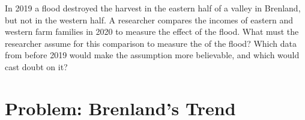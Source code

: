 \begin{exercise}[$\star\star\star$]\label{exo:g10:economic-models:15}
In 2019 a flood destroyed the harvest in the eastern half of a valley in Brenland, but not in the
western half. A researcher compares the incomes of eastern and western farm families in 2020 to
measure the effect of the flood. What must the researcher assume for this comparison to measure the
 of the flood? Which data from before 2019 would make the assumption more believable,
and which would cast doubt on it?
\end{exercise}

\section{Problem: Brenland's Trend}

